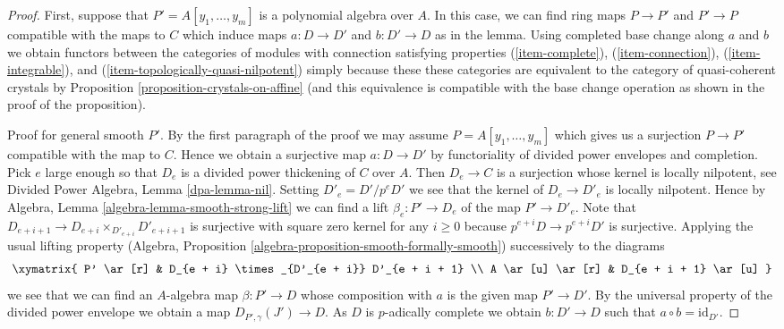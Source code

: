 \begin{proof}
First, suppose that $P' = A[y_1, \ldots, y_m]$ is a polynomial algebra
over $A$. In this case, we can find ring maps $P \to P'$ and $P' \to P$
compatible with the maps to $C$ which induce maps $a : D \to D'$ and
$b : D' \to D$ as in the lemma. Using completed base change along $a$
and $b$ we obtain functors between the categories of modules with connection
satisfying properties (\ref{item-complete}), (\ref{item-connection}),
(\ref{item-integrable}), and (\ref{item-topologically-quasi-nilpotent})
simply because these these categories are equivalent to the category
of quasi-coherent crystals by Proposition \ref{proposition-crystals-on-affine}
(and this equivalence is compatible with the base change operation as shown
in the proof of the proposition).

\medskip\noindent
Proof for general smooth $P'$.
By the first paragraph of the proof we may assume $P = A[y_1, \ldots, y_m]$
which gives us a surjection $P \to P'$ compatible with the map to $C$.
Hence we obtain a surjective map $a : D \to D'$ by functoriality of
divided power envelopes and completion. Pick $e$ large enough so that
$D_e$ is a divided power
thickening of $C$ over $A$. Then $D_e \to C$ is a surjection whose kernel
is locally nilpotent, see Divided Power Algebra, Lemma \ref{dpa-lemma-nil}.
Setting $D'_e = D'/p^eD'$
we see that the kernel of $D_e \to D'_e$ is locally nilpotent.
Hence by Algebra, Lemma \ref{algebra-lemma-smooth-strong-lift}
we can find a lift $\beta_e : P' \to D_e$ of the map $P' \to D'_e$.
Note that $D_{e + i + 1} \to D_{e + i} \times_{D'_{e + i}} D'_{e + i + 1}$
is surjective with square zero kernel for any $i \geq 0$ because
$p^{e + i}D \to p^{e + i}D'$ is surjective. Applying the usual lifting
property (Algebra, Proposition \ref{algebra-proposition-smooth-formally-smooth})
successively to the diagrams
$$
\xymatrix{
P' \ar[r] & D_{e + i} \times_{D'_{e + i}} D'_{e + i + 1} \\
A \ar[u] \ar[r] & D_{e + i + 1} \ar[u]
}
$$
we see that we can find an $A$-algebra map $\beta : P' \to D$ whose
composition with $a$ is the given map $P' \to D'$.
By the universal property of the divided power envelope we obtain a
map $D_{P', \gamma}(J') \to D$. As $D$ is $p$-adically complete we
obtain $b : D' \to D$ such that $a \circ b = \text{id}_{D'}$.


\end{proof}

